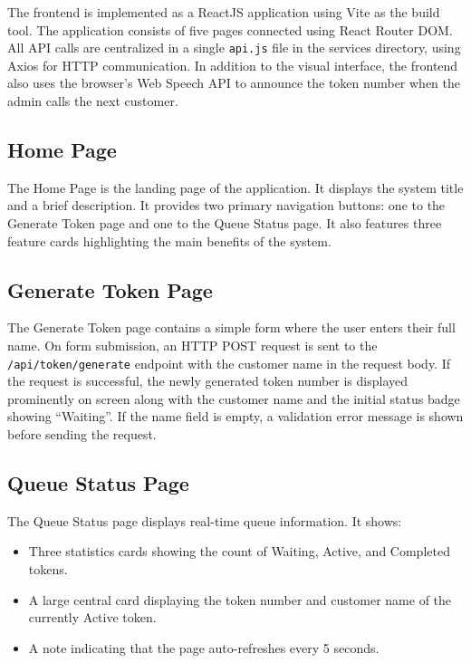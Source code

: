 The frontend is implemented as a ReactJS application using Vite as the build tool. The application consists of five pages connected using React Router DOM. All API calls are centralized in a single \texttt{api.js} file in the services directory, using Axios for HTTP communication. In addition to the visual interface, the frontend also uses the browser's Web Speech API to announce the token number when the admin calls the next customer.

\subsection{Home Page}

The Home Page is the landing page of the application. It displays the system title and a brief description. It provides two primary navigation buttons: one to the Generate Token page and one to the Queue Status page. It also features three feature cards highlighting the main benefits of the system.

\subsection{Generate Token Page}

The Generate Token page contains a simple form where the user enters their full name. On form submission, an HTTP POST request is sent to the \texttt{/api/token/generate} endpoint with the customer name in the request body. If the request is successful, the newly generated token number is displayed prominently on screen along with the customer name and the initial status badge showing ``Waiting''. If the name field is empty, a validation error message is shown before sending the request.

\subsection{Queue Status Page}

The Queue Status page displays real-time queue information. It shows:
\begin{itemize}
    \item Three statistics cards showing the count of Waiting, Active, and Completed tokens.
    \item A large central card displaying the token number and customer name of the currently Active token.
    \item A note indicating that the page auto-refreshes every 5 seconds.
\end{itemize}

